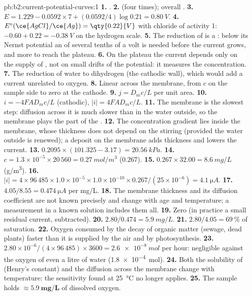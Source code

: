\begin{solution}{pb:b2:current-potential-curves:1}
\textbf{1.} .
\textbf{2.}  (four times); overall .
\textbf{3.} $E = 1.229 - 0.0592 \times 7 + (0.0592/4)\log 0.21 = \qty{0.80}{V}$.
\textbf{4.} $E^\circ(\ce{AgCl}/\ce{Ag}) = \qty{0.22}{V}$ with chloride of activity 1:
$-0.60 + 0.22 = \qty{-0.38}{V}$ on the hydrogen scale.
\textbf{5.} The reduction of  is a : below its Nernst potential
an  of several tenths of a volt is needed before the current
grows, and more to reach the plateau.
\textbf{6.} On the plateau the current depends only on the supply of ,
not on small drifts of the potential: it measures the concentration.
\textbf{7.} The reduction of water to dihydrogen (the cathodic wall), which would
add a current unrelated to oxygen.
\textbf{8.} Linear across the membrane, from $c$ on the sample side to zero at
the cathode.
\textbf{9.} $j = D_m c/L$ per unit area.
\textbf{10.} $i = -4FAD_m c/L$ (cathodic), $|i| = 4FAD_mc/L$.
\textbf{11.} The membrane is the slowest step: diffusion across it is much
slower than in the water outside, so the membrane plays the part of the
.
\textbf{12.} The concentration gradient lies inside the membrane, whose thickness
does not depend on the stirring (provided the water outside is renewed);
a deposit on the membrane adds thickness and lowers the current.
\textbf{13.} $0.2095 \times (101.325 - 3.17) = \qty{20.56}{kPa}$.
\textbf{14.} $c = 1.3 \times 10^{-5} \times 20\,560 = \qty{0.27}{mol/m^3}$ ($0.267$).
\textbf{15.} $0.267 \times 32.00 = \qty{8.6}{mg/L}$ (\unit{g/m^3}).
\textbf{16.} $|i| = 4 \times 96\,485 \times 1.0 \times 10^{-5} \times 1.0 \times 10^{-10}
\times 0.267/(25 \times 10^{-6}) = \qty{4.1}{\micro A}$.
\textbf{17.} $4.05/8.55 = \qty{0.474}{\micro A}$ per \unit{mg/L}.
\textbf{18.} The membrane thickness and its diffusion coefficient are not known
precisely and change with age and temperature; a measurement in a known
solution includes them all.
\textbf{19.} Zero (in practice a small residual current, subtracted).
\textbf{20.} $2.80/0.474 = \qty{5.9}{mg/L}$.
\textbf{21.} $2.80/4.05 = 69~\%$ of saturation.
\textbf{22.} Oxygen consumed by the decay of organic matter (sewage, dead plants)
faster than it is supplied by the air and by photosynthesis.
\textbf{23.} $2.80 \times 10^{-6}/(4 \times 96\,485) \times 3600 = \qty{2.6e-8}{mol}$
per hour: negligible against the oxygen of even a litre of water
(\qty{1.8e-4}{mol}).
\textbf{24.} Both the solubility of  (Henry's constant) and the diffusion
across the membrane change with temperature: the sensitivity found at
\qty{25}{\degreeCelsius} no longer applies.
\textbf{25.} The sample holds $\boldsymbol{\approx \qty{5.9}{mg/L}}$ of dissolved
oxygen.
\end{solution}
